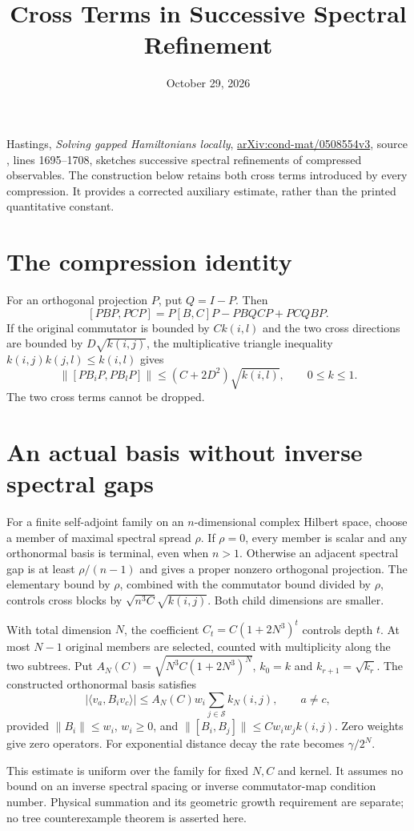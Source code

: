 \documentclass{article}
\title{Cross Terms in Successive Spectral Refinement}
\author{}
\date{October 29, 2026}
\begin{document}
\maketitle
{}

Hastings, \emph{Solving gapped Hamiltonians locally},
\href{https://arxiv.org/abs/cond-mat/0508554v3}{arXiv:cond-mat/0508554v3},
source , lines 1695--1708, sketches successive
spectral refinements of compressed observables. The construction below retains
both cross terms introduced by every compression. It provides a corrected
auxiliary estimate, rather than the printed quantitative constant.

\section{The compression identity}
For an orthogonal projection $P$, put $Q=I-P$. Then
\[
 [PBP,PCP]=P[B,C]P-PBQCP+PCQBP.
\]
If the original commutator is bounded by $Ck(i,l)$ and the two cross
directions are bounded by $D\sqrt{k(i,j)}$, the multiplicative triangle
inequality $k(i,j)k(j,l)\le k(i,l)$ gives
\[
 \|[PB_iP,PB_lP]\|\le(C+2D^2)\sqrt{k(i,l)},\qquad 0\le k\le1.
\]
The two cross terms cannot be dropped.

\section{An actual basis without inverse spectral gaps}
For a finite self-adjoint family on an $n$-dimensional complex Hilbert space,
choose a member of maximal spectral spread $\rho$. If $\rho=0$, every member
is scalar and any orthonormal basis is terminal, even when $n>1$.
Otherwise an adjacent spectral gap is at least $\rho/(n-1)$ and gives a
proper nonzero orthogonal projection. The elementary bound by $\rho$,
combined with the commutator bound divided by $\rho$, controls cross blocks
by $\sqrt{n^3C}\sqrt{k(i,j)}$. Both child dimensions are smaller.

With total dimension $N$, the coefficient $C_t=C(1+2N^3)^t$ controls depth $t$.
At most $N-1$ original members are selected, counted with multiplicity along
the two subtrees. Put $A_N(C)=\sqrt{N^3C(1+2N^3)^N}$,
$k_0=k$ and $k_{r+1}=\sqrt{k_r}$. The constructed orthonormal basis satisfies
\[
 |\langle v_a,B_iv_c\rangle|
 \le A_N(C)w_i\sum_{j\in\mathcal S}k_N(i,j),\qquad a\ne c,
\]
provided $\|B_i\|\le w_i$, $w_i\ge0$, and
$\|[B_i,B_j]\|\le Cw_iw_jk(i,j)$. Zero weights give zero operators.
For exponential distance decay the rate becomes $\gamma/2^N$.

This estimate is uniform over the family for fixed $N,C$ and kernel. It
assumes no bound on an inverse spectral spacing or inverse commutator-map
condition number. Physical summation and its geometric growth requirement
are separate; no tree counterexample theorem is asserted here.
\end{document}
